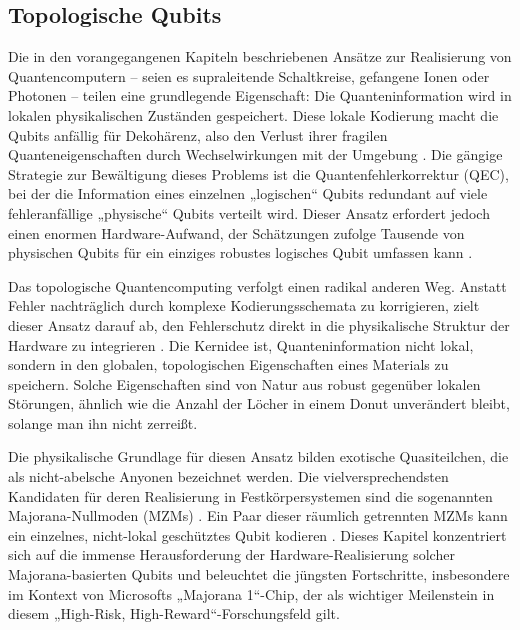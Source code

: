 \subsection{Topologische Qubits}
Die in den vorangegangenen Kapiteln beschriebenen Ansätze zur Realisierung von Quantencomputern – seien es supraleitende Schaltkreise, gefangene Ionen oder Photonen – teilen eine grundlegende Eigenschaft: Die Quanteninformation wird in lokalen physikalischen Zuständen gespeichert. Diese lokale Kodierung macht die Qubits anfällig für Dekohärenz, also den Verlust ihrer fragilen Quanteneigenschaften durch Wechselwirkungen mit der Umgebung \cite{bolgarMicrosoftsMajorana1}. Die gängige Strategie zur Bewältigung dieses Problems ist die Quantenfehlerkorrektur (QEC), bei der die Information eines einzelnen „logischen“ Qubits redundant auf viele fehleranfällige „physische“ Qubits verteilt wird. Dieser Ansatz erfordert jedoch einen enormen Hardware-Aufwand, der Schätzungen zufolge Tausende von physischen Qubits für ein einziges robustes logisches Qubit umfassen kann \cite{PDFMicrosoftsMajorana2025}.

Das topologische Quantencomputing verfolgt einen radikal anderen Weg. Anstatt Fehler nachträglich durch komplexe Kodierungsschemata zu korrigieren, zielt dieser Ansatz darauf ab, den Fehlerschutz direkt in die physikalische Struktur der Hardware zu integrieren \cite{lutchynRealizingMajoranaZero2017}. Die Kernidee ist, Quanteninformation nicht lokal, sondern in den globalen, topologischen Eigenschaften eines Materials zu speichern. Solche Eigenschaften sind von Natur aus robust gegenüber lokalen Störungen, ähnlich wie die Anzahl der Löcher in einem Donut unverändert bleibt, solange man ihn nicht zerreißt.

Die physikalische Grundlage für diesen Ansatz bilden exotische Quasiteilchen, die als nicht-abelsche Anyonen bezeichnet werden. Die vielversprechendsten Kandidaten für deren Realisierung in Festkörpersystemen sind die sogenannten Majorana-Nullmoden (MZMs) \cite{dougfinkeDeeperDiveMicrosofts2023}. Ein Paar dieser räumlich getrennten MZMs kann ein einzelnes, nicht-lokal geschütztes Qubit kodieren \cite{lutchynRealizingMajoranaZero2017}. Dieses Kapitel konzentriert sich auf die immense Herausforderung der Hardware-Realisierung solcher Majorana-basierten Qubits und beleuchtet die jüngsten Fortschritte, insbesondere im Kontext von Microsofts „Majorana 1“-Chip, der als wichtiger Meilenstein in diesem „High-Risk, High-Reward“-Forschungsfeld gilt.


